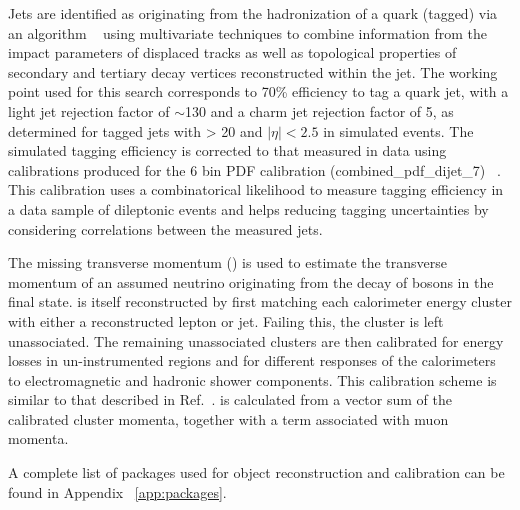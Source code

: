 Jets are identified as originating from the hadronization of a \bt
quark (\bt tagged) via an algorithm ~\cite{Aad:2015ydr}
using multivariate techniques to combine information from the impact
parameters of displaced tracks as well as topological properties of
secondary and tertiary decay vertices reconstructed within the jet.
The working point used for this search corresponds to 70\% efficiency to tag
a \bt quark jet, with a light jet rejection factor of $\sim$130 and
a charm jet rejection factor of 5, as determined for \bt tagged jets with
\pt > 20 \gev and $|\eta|<2.5$ in simulated \ttbar events. The simulated \bt tagging efficiency is corrected to that measured in data using calibrations produced for the 6 bin \ttbar PDF calibration (combined\_pdf\_dijet\_7) ~\cite{ATLAS-CONF-2014-004}. This calibration uses a combinatorical likelihood to measure \bt tagging efficiency in a data sample of dileptonic \ttbar events and helps reducing \bt tagging uncertainties by considering correlations between the measured jets.

The missing transverse momentum (\met) is used to estimate the
transverse momentum of an assumed neutrino originating from the decay
of \w bosons in the \ttbar final state.  \met is itself reconstructed
by first matching each calorimeter energy cluster with either a
reconstructed lepton or jet.  Failing this, the cluster is left
unassociated.  The remaining unassociated clusters are then calibrated
for energy losses in un-instrumented regions and for different
responses of the calorimeters to electromagnetic and hadronic shower
components.  This calibration scheme is similar to that described in
Ref.~\cite{ref:ATLAS-CONF-2011-080}. \met is calculated from a
vector sum of the calibrated cluster momenta, together with a term
associated with muon momenta.

A complete list of packages used for object reconstruction and
calibration can be found in Appendix ~\ref{app:packages}.
